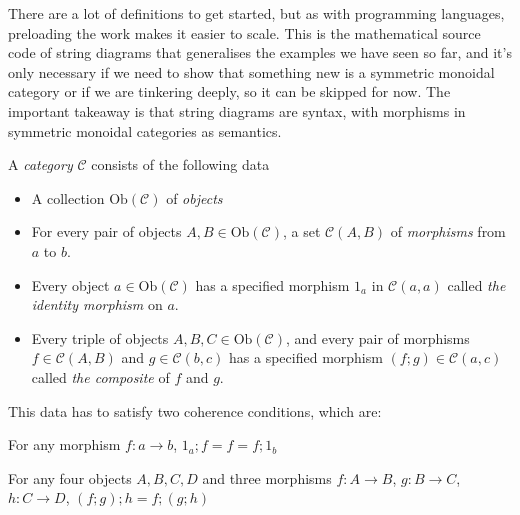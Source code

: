

There are a lot of definitions to get started, but as with programming languages, preloading the work makes it easier to scale. This is the mathematical source code of string diagrams that generalises the examples we have seen so far, and it's only necessary if we need to show that something new is a symmetric monoidal category or if we are tinkering deeply, so it can be skipped for now. The important takeaway is that string diagrams are syntax, with morphisms in symmetric monoidal categories as semantics.

\begin{defn}[Category]
A \emph{category} $\mathcal{C}$ consists of the following data
\begin{itemize}
\item{A collection $\text{Ob}(\mathcal{C})$ of \emph{objects}}
\item{For every pair of objects $A,B \in \text{Ob}(\mathcal{C})$, a set $\mathcal{C}(A,B)$ of \emph{morphisms} from $a$ to $b$.}
\item{Every object $a \in \text{Ob}(\mathcal{C})$ has a specified morphism $1_a$ in $\mathcal{C}(a,a)$ called \emph{the identity morphism} on $a$.}
\item{Every triple of objects $A,B,C \in \text{Ob}(\mathcal{C})$, and every pair of morphisms $f \in \mathcal{C}(A,B)$ and $g \in \mathcal{C}(b,c)$ has a specified morphism $(f;g) \in \mathcal{C}(a,c)$ called \emph{the composite} of $f$ and $g$.}
\end{itemize}
This data has to satisfy two coherence conditions, which are:

 For any morphism $f: a \rightarrow b$, $1_a;f = f = f;1_b$

 For any four objects $A,B,C,D$ and three morphisms $f: A \rightarrow B$, $g: B \rightarrow C$, $h: C \rightarrow D$, $(f;g);h = f;(g;h)$
\end{defn}

